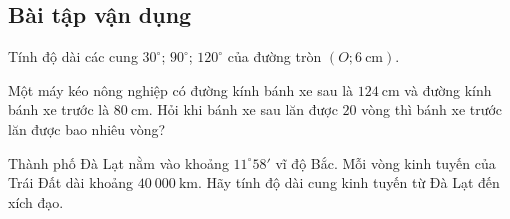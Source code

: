 \subsection{Bài tập vận dụng}
\begin{bt}
	Tính độ dài các cung $30^{\circ}$; $90^{\circ}$; $120^{\circ}$ của đường tròn $(O;6 \mathrm{~cm})$.
\end{bt}
\begin{bt}
	Một máy kéo nông nghiệp có đường kính bánh xe sau là $124 \mathrm{~cm}$ và đường kính bánh xe trước là $80 \mathrm{~cm}$. Hỏi khi bánh xe sau lăn được $20$ vòng thì bánh xe trước lăn được bao nhiêu vòng?
\end{bt}
\begin{bt}
	Thành phố Đà Lạt nằm vào khoảng $11^{\circ} 58'$ vĩ độ Bắc. Mỗi vòng kinh tuyến của Trái Đất dài khoảng $40\ 000 \mathrm{~km}$. Hãy tính độ dài cung kinh tuyến từ Đà Lạt đến xích đạo.
\end{bt}

